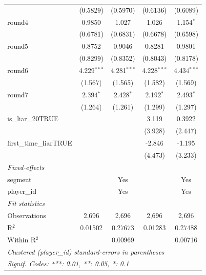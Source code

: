 \begin{tabular}{lcccc}
                               & (0.5829)           & (0.5970)          & (0.6136)      & (0.6089)\\   
   round4                      & 0.9850             & 1.027             & 1.026         & 1.154$^{*}$\\   
                               & (0.6781)           & (0.6831)          & (0.6678)      & (0.6598)\\   
   round5                      & 0.8752             & 0.9046            & 0.8281        & 0.9801\\   
                               & (0.8299)           & (0.8352)          & (0.8043)      & (0.8178)\\   
   round6                      & 4.229$^{***}$      & 4.281$^{***}$     & 4.228$^{***}$ & 4.434$^{***}$\\   
                               & (1.567)            & (1.565)           & (1.582)       & (1.569)\\   
   round7                      & 2.394$^{*}$        & 2.428$^{*}$       & 2.192$^{*}$   & 2.493$^{*}$\\   
                               & (1.264)            & (1.261)           & (1.299)       & (1.297)\\   
   is\_liar\_20TRUE            &                    &                   & 3.119         & 0.3922\\   
                               &                    &                   & (3.928)       & (2.447)\\   
   first\_time\_liarTRUE       &                    &                   & -2.846        & -1.195\\   
                               &                    &                   & (4.473)       & (3.233)\\   
   \midrule
   \emph{Fixed-effects}\\
   segment                     &                    & Yes               &               & Yes\\  
   player\_id                  &                    & Yes               &               & Yes\\  
   \midrule
   \emph{Fit statistics}\\
   Observations                & 2,696              & 2,696             & 2,696         & 2,696\\  
   R$^2$                       & 0.01502            & 0.27673           & 0.01283       & 0.27488\\  
   Within R$^2$                &                    & 0.00969           &               & 0.00716\\  
   \midrule \midrule
   \multicolumn{5}{l}{\emph{Clustered (player\_id) standard-errors in parentheses}}\\
   \multicolumn{5}{l}{\emph{Signif. Codes: ***: 0.01, **: 0.05, *: 0.1}}\\
\end{tabular}
\par\endgroup


